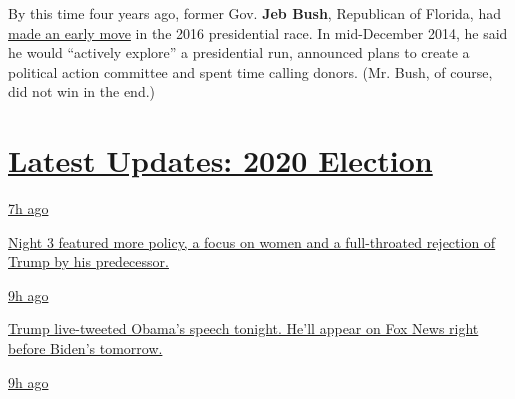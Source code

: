 By this time four years ago, former Gov. \textbf{Jeb Bush}, Republican
of Florida, had
\href{https://www.nytimes3xbfgragh.onion/2014/12/17/us/politics/jeb-bush-takes-a-step-toward-a-presidential-run-.html}{made
an early move} in the 2016 presidential race. In mid-December 2014, he
said he would ``actively explore'' a presidential run, announced plans
to create a political action committee and spent time calling donors.
(Mr. Bush, of course, did not win in the end.)

\hypertarget{latest-updates-2020-election}{%
\section{\texorpdfstring{\href{https://www.nytimes3xbfgragh.onion/live/2020/08/19/us/dnc-convention-election?action=click\&pgtype=Article\&state=default\&region=MAIN_CONTENT_1\&context=storylines_live_updates}{Latest
Updates: 2020
Election}}{Latest Updates: 2020 Election}}\label{latest-updates-2020-election}}

\href{https://www.nytimes3xbfgragh.onion/live/2020/08/19/us/dnc-convention-election?action=click\&pgtype=Article\&state=default\&region=MAIN_CONTENT_1\&context=storylines_live_updates\#night-3-featured-more-policy-a-focus-on-women-and-a-full-throated-rejection-of-trump-by-his-predecessor}{7h
ago}

\href{https://www.nytimes3xbfgragh.onion/live/2020/08/19/us/dnc-convention-election?action=click\&pgtype=Article\&state=default\&region=MAIN_CONTENT_1\&context=storylines_live_updates\#night-3-featured-more-policy-a-focus-on-women-and-a-full-throated-rejection-of-trump-by-his-predecessor}{Night
3 featured more policy, a focus on women and a full-throated rejection
of Trump by his predecessor.}

\href{https://www.nytimes3xbfgragh.onion/live/2020/08/19/us/dnc-convention-election?action=click\&pgtype=Article\&state=default\&region=MAIN_CONTENT_1\&context=storylines_live_updates\#trump-live-tweeted-obamas-speech-tonight-hell-appear-on-fox-news-right-before-bidens-tomorrow}{9h
ago}

\href{https://www.nytimes3xbfgragh.onion/live/2020/08/19/us/dnc-convention-election?action=click\&pgtype=Article\&state=default\&region=MAIN_CONTENT_1\&context=storylines_live_updates\#trump-live-tweeted-obamas-speech-tonight-hell-appear-on-fox-news-right-before-bidens-tomorrow}{Trump
live-tweeted Obama's speech tonight. He'll appear on Fox News right
before Biden's tomorrow.}

\href{https://www.nytimes3xbfgragh.onion/live/2020/08/19/us/dnc-convention-election?action=click\&pgtype=Article\&state=default\&region=MAIN_CONTENT_1\&context=storylines_live_updates\#advocates-for-domestic-violence-survivors-praised-biden-in-a-video}{9h
ago}

